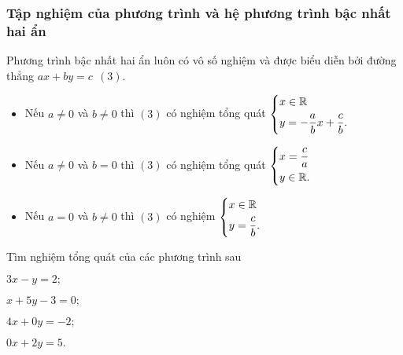 \subsubsection{Tập nghiệm của phương trình và hệ phương trình bậc nhất hai ẩn}
Phương trình bậc nhất hai ẩn luôn có vô số nghiệm và được biểu diễn bởi đường thẳng $ax+by=c \ \ (3)$.
\begin{itemize}
	\item Nếu $a \neq 0$ và $b \neq 0$ thì $(3)$ có nghiệm tổng quát $\left\{\begin{aligned}&x \in \mathbb{R}\\ &y=-\dfrac{a}{b}x+\dfrac{c}{b}.\end{aligned}\right.$
	\item Nếu $a \neq 0$ và $b=0$ thì $(3)$ có nghiệm tổng quát $\left\{\begin{aligned}&x=\dfrac{c}{a}\\&y \in \mathbb{R}.\end{aligned}\right.$
	\item Nếu $a=0$ và $b \neq 0$ thì $(3)$ có nghiệm $\left\{\begin{aligned}&x \in \mathbb{R}\\&y=\dfrac{c}{b}.\end{aligned}\right.$
\end{itemize}
\begin{vd}
	Tìm nghiệm tổng quát của các phương trình sau
	\begin{enumEX}{2}
		\item $3x-y=2;$
		\item $x+5y-3=0;$
		\item $4x+0y=-2;$
		\item $0x+2y=5.$
	\end{enumEX}
\end{vd}

